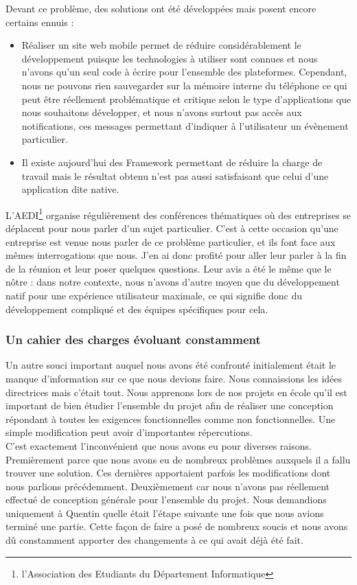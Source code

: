 \documentclass{article}
\begin{document}
		Devant ce problème, des solutions ont été développées mais posent encore certains ennuis : 
		\begin{itemize}
			\item Réaliser un site web mobile permet de réduire considérablement le développement puisque les technologies à utiliser sont connues et nous n'avons qu'un seul code à écrire pour l'ensemble des plateformes. Cependant, nous ne pouvons rien sauvegarder sur la mémoire interne du téléphone ce qui peut être réellement problématique et critique selon le type d'applications que nous souhaitons développer, et nous n'avons surtout pas accès aux notifications, ces messages permettant d'indiquer à l'utilisateur un évènement particulier. 
			\item Il existe aujourd'hui des Framework permettant de réduire la charge de travail mais le résultat obtenu n'est pas aussi satisfaisant que celui d'une application dite native.\\
		\end{itemize}
		
		L'AEDI\footnote{l'Association des Etudiants du Département Informatique} organise régulièrement des conférences thématiques où des entreprises se déplacent pour nous parler d'un sujet particulier. C'est à cette occasion qu'une entreprise est venue nous parler de ce problème particulier, et ils font face aux mêmes interrogations que nous. J'en ai donc profité pour aller leur parler à la fin de la réunion et leur poser quelques questions. Leur avis a été le même que le nôtre : dans notre contexte, nous n'avons d'autre moyen que du développement natif pour une expérience utilisateur maximale, ce qui signifie donc du développement compliqué et des équipes spécifiques pour cela.
		
\subsubsection{Un cahier des charges évoluant constamment}
		Un autre souci important auquel nous avons été confronté initialement était le manque d'information sur ce que nous devions faire. Nous connaissions les idées directrices mais c'était tout. Nous apprenons lors de nos projets en école qu'il est important de bien étudier l'ensemble du projet afin de réaliser une conception répondant à toutes les exigences fonctionnelles comme non fonctionnelles. Une simple modification peut avoir d'importantes répercutions. \\
			
		C'est exactement l'inconvénient que nous avons eu pour diverses raisons. Premièrement parce que nous avons eu de nombreux problèmes auxquels il a fallu trouver une solution. Ces dernières apportaient parfois les modifications dont nous parlions précédemment. Deuxièmement car nous n'avons pas réellement effectué de conception générale pour l'ensemble du projet. Nous demandions uniquement à Quentin quelle était l'étape suivante une fois que nous avions terminé une partie. Cette façon de faire a posé de nombreux soucis et nous avons dû constamment apporter des changements à ce qui avait déjà été fait.\\
		
\end{document}
